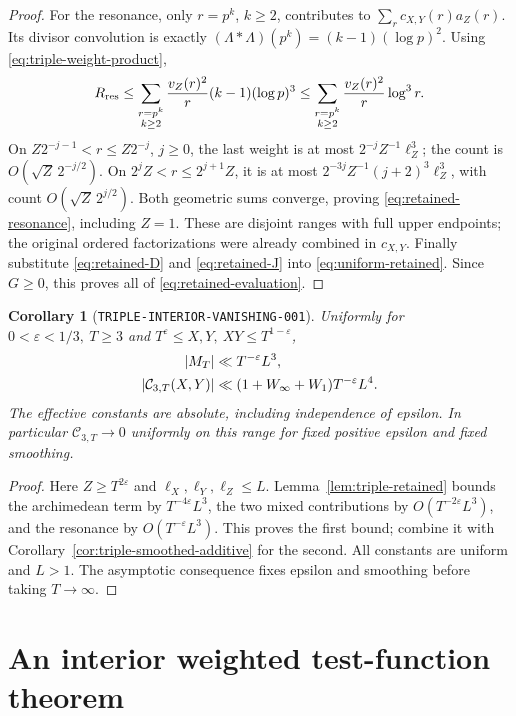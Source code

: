 \documentclass[11pt]{article}
\newtheorem{corollary}[lemma]{Corollary}
\newcommand{\CT}{\mathcal C_{3,T}}
\begin{document}
\begin{proof}
For the resonance, only \(r=p^k\), \(k\geq2\), contributes to
\(\sum_r c_{X,Y}(r)a_Z(r)\). Its divisor convolution is exactly
\((\Lambda*\Lambda)(p^k)=(k-1)(\log p)^2\).
Using \eqref{eq:triple-weight-product},
\[
 R_{\rm res}\leq\sum_{\substack{r=p^k\\k\geq2}}
 \frac{v_Z(r)^2}{r}(k-1)(\log p)^3
 \leq\sum_{\substack{r=p^k\\k\geq2}}
             \frac{v_Z(r)^2}{r}\log^3r .
\]
On \(Z2^{-j-1}<r\leq Z2^{-j}\), \(j\geq0\), the last weight is
at most \(2^{-j}Z^{-1}\ell_Z^3\); the count is
\(O(\sqrt Z\,2^{-j/2})\).
On \(2^jZ<r\leq2^{j+1}Z\), it is at most
\(2^{-3j}Z^{-1}(j+2)^3\ell_Z^3\), with count
\(O(\sqrt Z\,2^{j/2})\).
Both geometric sums converge, proving \eqref{eq:retained-resonance},
including \(Z=1\). These are disjoint ranges with full upper endpoints;
the original ordered factorizations were already combined in \(c_{X,Y}\).
Finally substitute \eqref{eq:retained-D} and \eqref{eq:retained-J} into
\eqref{eq:uniform-retained}. Since \(G\geq0\), this proves all of
\eqref{eq:retained-evaluation}.
\end{proof}

\begin{corollary}[\texttt{TRIPLE-INTERIOR-VANISHING-001}]
\label{cor:triple-interior-vanishing}
Uniformly for \(0<\varepsilon<1/3,\ T\geq3\) and
\(T^\varepsilon\leq X,Y,\ XY\leq T^{1-\varepsilon}\),
\begin{align}
 |M_T|&\ll T^{-\varepsilon}L^3,\notag\\
 |\CT(X,Y)|&\ll(1+W_\infty+W_1)T^{-\varepsilon}L^4.
 \label{eq:triple-interior-zero}
\end{align}
The effective constants are absolute, including independence of epsilon.
In particular \(\CT\to0\) uniformly on this range for fixed positive
epsilon and fixed smoothing.
\end{corollary}
\begin{proof}
Here \(Z\geq T^{2\varepsilon}\) and \(\ell_X,\ell_Y,\ell_Z\leq L\).
Lemma~\ref{lem:triple-retained} bounds the archimedean term by
\(T^{-4\varepsilon}L^3\), the two mixed contributions by
\(O(T^{-2\varepsilon}L^3)\), and the resonance by
\(O(T^{-\varepsilon}L^3)\).
This proves the first bound; combine it with
Corollary~\ref{cor:triple-smoothed-additive} for the second.
All constants are uniform and \(L>1\). The asymptotic consequence fixes
epsilon and smoothing before taking \(T\to\infty\).
\end{proof}

\section{An interior weighted test-function theorem}
\end{document}
